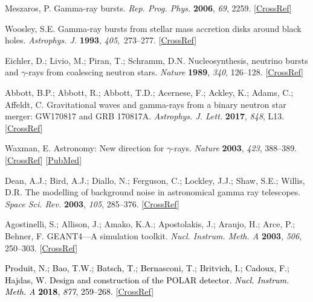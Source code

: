 \documentclass[galaxies,article,accept,moreauthors,pdftex,10pt,a4paper]{mdpi}
\begin{document}
\begin{thebibliography}{999}

Meszaros, P. Gamma-ray bursts. {\em Rep. Prog. Phys.} {\bf 2006}, {\em 69}, 2259. [\href{http://dx.doi.org/10.1088/0034-4885/69/8/R01}{CrossRef}]

Woosley, S.E. Gamma-ray bursts from stellar mass accretion disks around black holes. {\em Astrophys. J.} {\bf 1993}, {\em 405},~273--277. [\href{http://dx.doi.org/10.1086/172359}{CrossRef}]

Eichler, D.; Livio, M.; Piran, T.;   Schramm, D.N. Nucleosynthesis, neutrino bursts and $\gamma$-rays from coalescing neutron stars. {\em Nature} {\bf 1989}, {\em 340}, 126--128. [\href{http://dx.doi.org/10.1038/340126a0}{CrossRef}]

Abbott, B.P.; Abbott, R.; Abbott, T.D.; Acernese, F.; Ackley, K.; Adams, C.;  Affeldt, C. Gravitational waves and gamma-rays from a binary neutron star merger: GW170817 and GRB 170817A. {\em Astrophys. J. Lett.} {\bf 2017}, {\em 848}, L13. [\href{http://dx.doi.org/10.3847/2041-8213/aa920c}{CrossRef}]

Waxman, E. Astronomy: New direction for $\gamma$-rays. {\em Nature} {\bf 2003}, {\em 423}, 388--389. [\href{http://dx.doi.org/10.1038/423388a}{CrossRef}] [\href{http://www.ncbi.nlm.nih.gov/pubmed/12761528}{PubMed}]

Dean, A.J.; Bird, A.J.; Diallo, N.; Ferguson, C.; Lockley, J.J.; Shaw, S.E.;  Willis, D.R. The modelling of background noise in astronomical gamma ray telescopes. {\em Space Sci. Rev.} {\bf 2003}, {\em 105}, 285--376. [\href{http://dx.doi.org/10.1023/A:1023995803108}{CrossRef}]

Agostinelli, S.; Allison, J.; Amako, K.A.; Apostolakis, J.; Araujo, H.; Arce, P.; Behner, F. GEANT4---A simulation toolkit. {\em Nucl. Instrum. Meth. A} {\bf 2003}, {\em 506}, 250--303. [\href{http://dx.doi.org/10.1016/S0168-9002(03)01368-8}{CrossRef}]

\textcolor{black}{
Produit, N.; Bao, T.W.; Batsch, T.; Bernasconi, T.; Britvich, I.; Cadoux, F.; Hajdas, W. Design and construction of the POLAR detector. {\em Nucl. Instrum. Meth. A} {\bf 2018}, {\em 877}, 259--268.
} [\href{http://dx.doi.org/10.1016/j.nima.2017.09.053}{CrossRef}]


\end{thebibliography}
\end{document}
